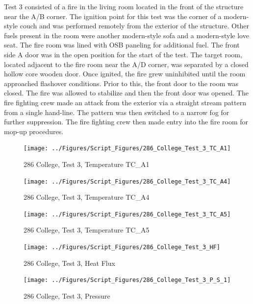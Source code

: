 \documentclass[12pt,oneside]{book}
\begin{document}
Test 3 consisted of a fire in the living room located in the front of the structure near the A/B corner.  The ignition point for this test was the corner of a modern-style couch and was performed remotely from the exterior of the structure.  Other fuels present in the room were another modern-style sofa and a modern-style love seat.  The fire room was lined with OSB paneling for additional fuel.  The front side A door was in the open position for the start of the test.  The target room, located adjacent to the fire room near the A/D corner, was separated by a closed hollow core wooden door.  Once ignited, the fire grew uninhibited until the room approached flashover conditions.  Prior to this, the front door to the room was closed.  The fire was allowed to stabilize and then the front door was opened.  The fire fighting crew made an attack from the exterior via a straight stream pattern from a single hand-line.  The pattern was then switched to a narrow fog for further suppression.  The fire fighting crew then made entry into the fire room for mop-up procedures.           

\begin{figure}[!ht]
\texttt{[image: ../Figures/Script\_Figures/286\_College\_Test\_3\_TC\_A1]}
\caption{286 College, Test 3, Temperature TC\_A1}
\label{fig:286_College_Test_3_TC_A1}
\end{figure}

\begin{figure}[!ht]
\texttt{[image: ../Figures/Script\_Figures/286\_College\_Test\_3\_TC\_A4]}
\caption{286 College, Test 3, Temperature TC\_A4}
\label{fig:286_College_Test_3_TC_A4}
\end{figure}

\begin{figure}[!ht]
\texttt{[image: ../Figures/Script\_Figures/286\_College\_Test\_3\_TC\_A5]}
\caption{286 College, Test 3, Temperature TC\_A5}
\label{fig:286_College_Test_3_TC_A5}
\end{figure}

\begin{figure}[!ht]
\texttt{[image: ../Figures/Script\_Figures/286\_College\_Test\_3\_HF]}
\caption{286 College, Test 3, Heat Flux}
\label{fig:286_College_Test_3_HF}
\end{figure}

\begin{figure}[!ht]
\texttt{[image: ../Figures/Script\_Figures/286\_College\_Test\_3\_P\_S\_1]}
\caption{286 College, Test 3, Pressure}
\label{fig:286_College_Test_3_P_S_1}
\end{figure}
\end{document}
